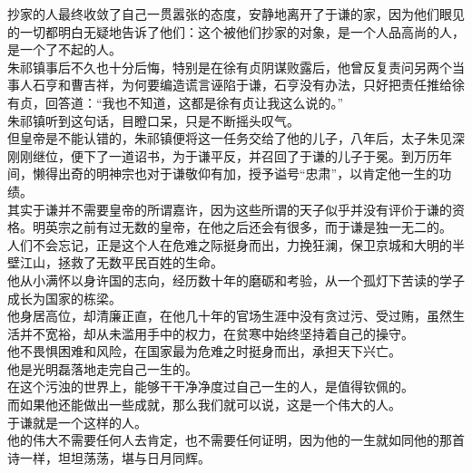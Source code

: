 \begin{multicols}{\theparacolNo}
抄家的人最终收敛了自己一贯嚣张的态度，安静地离开了于谦的家，因为他们眼见的一切都明白无疑地告诉了他们：这个被他们抄家的对象，是一个人品高尚的人，是一个了不起的人。\\

朱祁镇事后不久也十分后悔，特别是在徐有贞阴谋败露后，他曾反复责问另两个当事人石亨和曹吉祥，为何要编造谎言诬陷于谦，石亨没有办法，只好把责任推给徐有贞，回答道：“我也不知道，这都是徐有贞让我这么说的。”\\

朱祁镇听到这句话，目瞪口呆，只是不断摇头叹气。\\

但皇帝是不能认错的，朱祁镇便将这一任务交给了他的儿子，八年后，太子朱见深刚刚继位，便下了一道诏书，为于谦平反，并召回了于谦的儿子于冕。到万历年间，懒得出奇的明神宗也对于谦敬仰有加，授予谥号“忠肃”，以肯定他一生的功绩。\\

其实于谦并不需要皇帝的所谓嘉许，因为这些所谓的天子似乎并没有评价于谦的资格。明英宗之前有过无数的皇帝，在他之后还会有很多，而于谦是独一无二的。\\

人们不会忘记，正是这个人在危难之际挺身而出，力挽狂澜，保卫京城和大明的半壁江山，拯救了无数平民百姓的生命。\\

他从小满怀以身许国的志向，经历数十年的磨砺和考验，从一个孤灯下苦读的学子成长为国家的栋梁。\\

他身居高位，却清廉正直，在他几十年的官场生涯中没有贪过污、受过贿，虽然生活并不宽裕，却从未滥用手中的权力，在贫寒中始终坚持着自己的操守。\\

他不畏惧困难和风险，在国家最为危难之时挺身而出，承担天下兴亡。\\

他是光明磊落地走完自己一生的。\\

在这个污浊的世界上，能够干干净净度过自己一生的人，是值得钦佩的。\\

而如果他还能做出一些成就，那么我们就可以说，这是一个伟大的人。\\

于谦就是一个这样的人。\\

他的伟大不需要任何人去肯定，也不需要任何证明，因为他的一生就如同他的那首诗一样，坦坦荡荡，堪与日月同辉。\\


\end{multicols}
